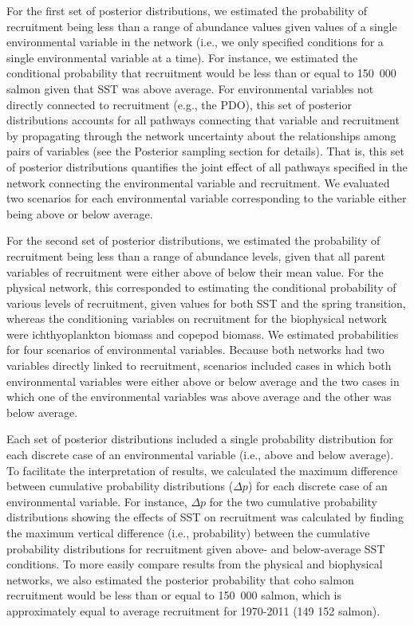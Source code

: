 For the first set of posterior distributions, we estimated the probability of
recruitment being less than a range of abundance values given values of a single
environmental variable in the network (i.e., we only specified conditions for a
single environmental variable at a time). For instance, we estimated the
conditional probability that recruitment would be less than or equal to 150~000
salmon given that SST was above average. For environmental variables not
directly connected to recruitment (e.g., the PDO), this set of posterior
distributions accounts for all pathways connecting that variable and recruitment
by propagating through the network uncertainty about the relationships among
pairs of variables (see the Posterior sampling section for details). That is,
this set of posterior distributions quantifies the joint effect of all pathways
specified in the network connecting the environmental variable and recruitment.
We evaluated two scenarios for each environmental variable corresponding to the
variable either being above or below average.

For the second set of posterior distributions, we estimated the probability of
recruitment being less than a range of abundance levels, given that all parent
variables of recruitment were either above of below their mean value. For the
physical network, this corresponded to estimating the conditional probability of
various levels of recruitment, given values for both SST and the spring
transition, whereas the conditioning variables on recruitment for the
biophysical network were ichthyoplankton biomass and copepod biomass. We
estimated probabilities for four scenarios of environmental variables. Because
both networks had two variables directly linked to recruitment, scenarios
included cases in which both environmental variables were either above or below
average and the two cases in which one of the environmental variables was above
average and the other was below average.

Each set of posterior distributions included a single probability distribution
for each discrete case of an environmental variable (i.e., above and below
average). To facilitate the interpretation of results, we calculated the maximum
difference between cumulative probability distributions (\(\Delta p\)) for each
discrete case of an environmental variable. For instance, \(\Delta p\) for the
two cumulative probability distributions showing the effects of SST on
recruitment was calculated by finding the maximum vertical difference (i.e.,
probability) between the cumulative probability distributions for recruitment
given above- and below-average SST conditions. To more easily compare results
from the physical and biophysical networks, we also estimated the posterior
probability that coho salmon recruitment would be less than or equal to 150~000
salmon, which is approximately equal to average recruitment for 1970-2011 (149
152 salmon).


